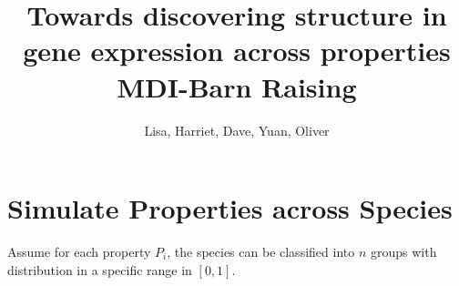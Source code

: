\documentclass[11pt]{article}
\theoremstyle{plain}
\theoremstyle{definition}
\begin{document}
\title{Towards discovering structure in gene expression across properties\\
\small MDI-Barn Raising}
\author{Lisa, Harriet, Dave, Yuan, Oliver}
\maketitle

\section{Simulate Properties across Species}
Assume for each property $P_i$, the species can be classified into $n$ groups with distribution in a specific range in $[0, 1]$.
\end{document}
